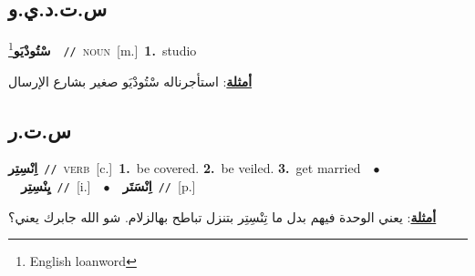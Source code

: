 \documentclass[10pt,a4paper,twoside]{article} %
\begin{document}
\begin{multicols}{2}
{{{{{{{{{{{{{{{\vspace{-3mm}
\subsection*{\color{blue}\foreignlanguage{arabic}{س.ت.د.ي.و}\color{blue}{ (ntws)}} 

{\setlength\topsep{0pt}\textbf{\foreignlanguage{arabic}{سْتُودْيَو}}\footnote{English loanword}\ \ {\color{gray}\texttt{//}\color{black}}\ \textsc{noun}\ [m.]\ \textbf{1.}~studio\  \begin{flushright}\color{gray}\foreignlanguage{arabic}{\textbf{\underline{\foreignlanguage{arabic}{أمثلة}}}: استأجرناله سْتُودْيَو صغير بشارع الإرسال}\end{flushright}\color{black}} \vspace{2mm}

\vspace{-3mm}
\subsection*{\color{blue}\foreignlanguage{arabic}{س.ت.ر}\color{blue}{}} 

{\setlength\topsep{0pt}\textbf{\foreignlanguage{arabic}{اِنْسِتِر}}\ {\color{gray}\texttt{//}\color{black}}\ \textsc{verb}\ [c.]\ \textbf{1.}~be covered.  \textbf{2.}~be veiled.  \textbf{3.}~get married\ \ $\bullet$\ \ \setlength\topsep{0pt}\textbf{\foreignlanguage{arabic}{يِنْسِتِر}}\ {\color{gray}\texttt{//}\color{black}}\ [i.]\ \ $\bullet$\ \ \setlength\topsep{0pt}\textbf{\foreignlanguage{arabic}{اِنْسَتَر}}\ {\color{gray}\texttt{//}\color{black}}\ [p.]\  \begin{flushright}\color{gray}\foreignlanguage{arabic}{\textbf{\underline{\foreignlanguage{arabic}{أمثلة}}}: يعني الوحدة فيهم بدل ما تِنْسِتِر بتنزل تباطح بهالزلام. شو الله جابرك يعني؟}\end{flushright}\color{black}} \vspace{2mm}

}}}}}}}}}}}}}}}
\end{multicols}
\end{document}
